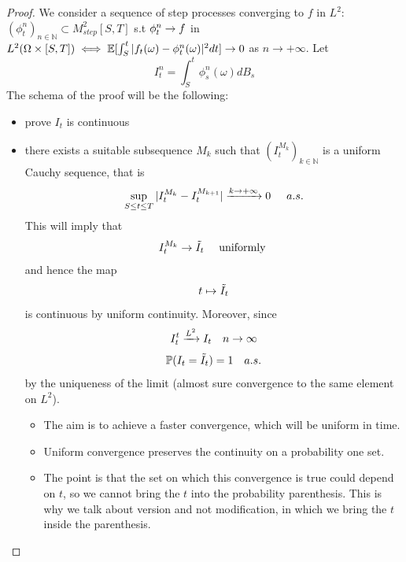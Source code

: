 \begin{proof}
We consider a sequence of step processes converging to $f$ in $L^2$: 
    $(\phi_t^n)_{n \in \mathbb{N}}\subset M^2_{step}[S,T]$ s.t $\phi^n_t \rightarrow f$ in $L^2(\Omega \times [S,T]) \iff \mathbb{E}[\int_S^t |f_t(\omega) - \phi_t^n(\omega)|^2 dt] \rightarrow 0$ as $n \rightarrow +\infty$. Let 
    \begin{equation*}
        I_t^n= \int_S^t \phi_s^n(\omega) dB_s
    \end{equation*}
    The schema of the proof will be the following:
    \begin{itemize}
        \item prove $I_t$ is continuous
        \item there exists a suitable subsequence $M_k$ such that $(I_t^{M_k})_{k \in \mathbb{N}}$ is a uniform Cauchy sequence, that is  
        \begin{equation}\label{U-C}
        \sup_{S\leq t\leq T}|I_t^{M_k}-I_t^{M_{k+1}}| \xrightarrow{k \rightarrow +\infty} 0 \hspace{0.5 cm} a.s.
        \end{equation}
        This will imply that 
        \begin{equation*}
        I_t^{M_k}\rightarrow \Tilde{I}_t \quad \text{ uniformly }
        \end{equation*}
        and hence the map
        \begin{equation*}
            t \mapsto \Tilde{I}_t
        \end{equation*}
        is continuous by uniform continuity. Moreover, since 
        \begin{equation*}
            I_t^t \xrightarrow{L^2} I_t \quad n \rightarrow \infty
        \end{equation*}
        \begin{equation*}
            \mathbb{P}(I_t = \Tilde{I}_t)=1 \quad a.s.
        \end{equation*}
        by the uniqueness of the limit (almost sure convergence to the same element on $L^2$). 
        \begin{remark}
        \begin{itemize}
            \item The aim is to achieve a faster convergence, which will be uniform in time.
            \item Uniform convergence preserves the continuity on a probability one set. 
            \item The point is that the set on which this convergence is true could depend on $t$, so we cannot bring the $t$ into the probability parenthesis. This is why we talk about version and not modification, in which we bring the $t$ inside the parenthesis.

\end{itemize}
\end{remark}
\end{itemize}
\end{proof}
